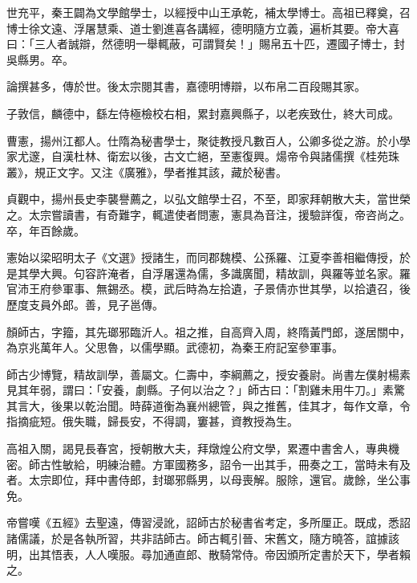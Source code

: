 \begin{pinyinscope}
 世充平，秦王闢為文學館學士，以經授中山王承乾，補太學博士。高祖已釋奠，召博士徐文遠、浮屠慧乘、道士劉進喜各講經，德明隨方立義，遍析其要。帝大喜曰：「三人者誠辯，然德明一舉輒蔽，可謂賢矣！」賜帛五十匹，遷國子博士，封吳縣男。卒。



 論撰甚多，傳於世。後太宗閱其書，嘉德明博辯，以布帛二百段賜其家。



 子敦信，麟德中，繇左侍極檢校右相，累封嘉興縣子，以老疾致仕，終大司成。



 曹憲，揚州江都人。仕隋為秘書學士，聚徒教授凡數百人，公卿多從之游。於小學家尤邃，自漢杜林、衛宏以後，古文亡絕，至憲復興。煬帝令與諸儒撰《桂苑珠叢》，規正文字。又注《廣雅》，學者推其該，藏於秘書。



 貞觀中，揚州長史李襲譽薦之，以弘文館學士召，不至，即家拜朝散大夫，當世榮之。太宗嘗讀書，有奇難字，輒遣使者問憲，憲具為音注，援驗詳復，帝咨尚之。卒，年百餘歲。



 憲始以梁昭明太子《文選》授諸生，而同郡魏模、公孫羅、江夏李善相繼傳授，於是其學大興。句容許淹者，自浮屠還為儒，多識廣聞，精故訓，與羅等並名家。羅官沛王府參軍事、無錫丞。模，武后時為左拾遺，子景倩亦世其學，以拾遺召，後歷度支員外郎。善，見子邕傳。



 顏師古，字籀，其先瑯邪臨沂人。祖之推，自高齊入周，終隋黃門郎，遂居關中，為京兆萬年人。父思魯，以儒學顯。武德初，為秦王府記室參軍事。



 師古少博覽，精故訓學，善屬文。仁壽中，李綱薦之，授安養尉。尚書左僕射楊素見其年弱，謂曰：「安養，劇縣。子何以治之？」師古曰：「割雞未用牛刀。」素驚其言大，後果以乾治聞。時薛道衡為襄州總管，與之推舊，佳其才，每作文章，令指摘疵短。俄失職，歸長安，不得調，窶甚，資教授為生。



 高祖入關，謁見長春宮，授朝散大夫，拜燉煌公府文學，累遷中書舍人，專典機密。師古性敏給，明練治體。方軍國務多，詔令一出其手，冊奏之工，當時未有及者。太宗即位，拜中書侍郎，封瑯邪縣男，以母喪解。服除，還官。歲餘，坐公事免。



 帝嘗嘆《五經》去聖遠，傳習浸訛，詔師古於秘書省考定，多所厘正。既成，悉詔諸儒議，於是各執所習，共非詰師古。師古輒引晉、宋舊文，隨方曉答，誼據該明，出其悟表，人人嘆服。尋加通直郎、散騎常侍。帝因頒所定書於天下，學者賴之。




\end{pinyinscope}
